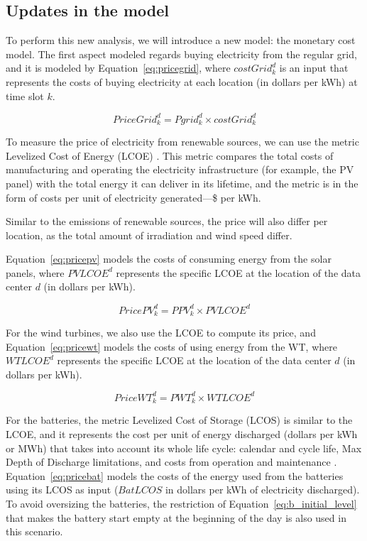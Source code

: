 \subsection{Updates in the model}

To perform this new analysis, we will introduce a new model: the monetary cost model. The first aspect modeled regards buying electricity from the regular grid, and it is modeled by Equation~\eqref{eq:pricegrid}, where $costGrid^d_k$ is an input that represents the costs of buying electricity at each location (in dollars per kWh) at time slot $k$.

\begin{equation} \label{eq:pricegrid}
 PriceGrid^d_k = Pgrid^d_k \times costGrid^d_k
\end{equation}

To measure the price of electricity from renewable sources, we can use the metric Levelized Cost of Energy (LCOE) \cite{nrel_economic_wt_1995}. This metric compares the total costs of manufacturing and operating the electricity infrastructure (for example, the PV panel) with the total energy it can deliver in its lifetime, and the metric is in the form of costs per unit of electricity generated---\$ per kWh.

Similar to the  emissions of renewable sources, the price will also differ per location, as the total amount of irradiation and wind speed differ.

Equation~\eqref{eq:pricepv} models the costs of consuming energy from the solar panels, where $PVLCOE^d$ represents the specific LCOE at the location of the data center $d$ (in dollars per kWh).

\begin{equation} \label{eq:pricepv}
  PricePV^d_k = PPV^d_k \times PVLCOE^d
\end{equation}


For the wind turbines, we also use the LCOE to compute its price, and Equation~\eqref{eq:pricewt} models the costs of using energy from the WT, where $WTLCOE^d$ represents the specific LCOE at the location of the data center $d$ (in dollars per kWh).

\begin{equation} \label{eq:pricewt}
  PriceWT^d_k = PWT^d_k \times WTLCOE^d
\end{equation}

For the batteries, the metric Levelized Cost of Storage (LCOS) is similar to the LCOE, and it represents the cost per unit of energy discharged (dollars per kWh or MWh) that takes into account its whole life cycle: calendar and cycle life, Max Depth of Discharge limitations, and costs from operation and maintenance \cite{battery_lcos_2022}.  Equation~\eqref{eq:pricebat} models the costs of the energy used from the batteries using its LCOS as input ($BatLCOS$ in dollars per kWh of electricity discharged). To avoid oversizing the batteries, the restriction of Equation~\eqref{eq:b_initial_level} that makes the battery start empty at the beginning of the day is also used in this scenario.

